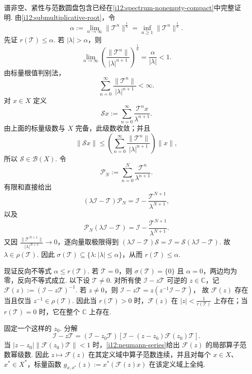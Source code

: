 \begin{FAProof}
谱非空、紧性与范数圆盘包含已经在\autoref{i12:spectrum-nonempty-compact}中完整证明. 由\autoref{i12:submultiplicative-root}，令
\[
\alpha
:=
\lim_{n\to\infty}\|\mathcal T^n\|^{\frac{1}{n}}
=
\inf_{n\geqslant1}\|\mathcal T^n\|^{\frac{1}{n}}.
\]
先证 \(\displaystyle r(\mathcal T)\leqslant\alpha\). 若 \(\displaystyle |\lambda|>\alpha\)，则
\[
\lim_{n\to\infty}
\left(
\frac{\|\mathcal T^n\|}{|\lambda|^{n+1}}
\right)^{\frac{1}{n}}
=
\frac{\alpha}{|\lambda|}
<1.
\]
由标量根值判别法，
\[
\sum_{n=0}^{\infty}
\frac{\|\mathcal T^n\|}{|\lambda|^{n+1}}
<\infty.
\]
对 \(\displaystyle x\in X\) 定义
\[
\mathcal Sx
:=
\sum_{n=0}^{\infty}
\frac{\mathcal T^n x}{\lambda^{n+1}}.
\]
由上面的标量级数与 \(\displaystyle X\) 完备，此级数收敛；并且
\[
\|\mathcal Sx\|
\leqslant
\left(
\sum_{n=0}^{\infty}
\frac{\|\mathcal T^n\|}{|\lambda|^{n+1}}
\right)
\|x\|,
\]
所以 \(\displaystyle \mathcal S\in\mathcal B(X)\). 令
\[
\mathcal P_N
:=
\sum_{n=0}^{N}
\frac{\mathcal T^n}{\lambda^{n+1}}.
\]
有限和直接给出
\[
(\lambda\mathcal I-\mathcal T)\mathcal P_N
=
\mathcal I-\frac{\mathcal T^{N+1}}{\lambda^{N+1}},
\]
以及
\[
\mathcal P_N(\lambda\mathcal I-\mathcal T)
=
\mathcal I-\frac{\mathcal T^{N+1}}{\lambda^{N+1}}.
\]
又因 \(\displaystyle \frac{\|\mathcal T^{N+1}\|}{|\lambda|^{N+1}}\to0\)，逐向量取极限得到
\(\displaystyle (\lambda\mathcal I-\mathcal T)\mathcal S = \mathcal I = \mathcal S(\lambda\mathcal I-\mathcal T)\).
故 \(\displaystyle \lambda\in\rho(\mathcal T)\). 因此 \(\displaystyle \sigma(\mathcal T)\subseteq\{\lambda:|\lambda|\leqslant\alpha\}\)，从而 \(\displaystyle r(\mathcal T)\leqslant\alpha\).

现证反向不等式 \(\displaystyle \alpha\leqslant r(\mathcal T)\). 若 \(\displaystyle \mathcal T=0\)，则 \(\displaystyle \sigma(\mathcal T)=\{0\}\) 且 \(\displaystyle \alpha=0\)，两边均为零，反向不等式成立. 以下设 \(\displaystyle \mathcal T\neq0\). 对所有使 \(\displaystyle \mathcal I-z\mathcal T\) 可逆的 \(\displaystyle z\in\mathbb C\)，记
\(\displaystyle \mathcal F(z) := (\mathcal I-z\mathcal T)^{-1}\).
若 \(\displaystyle z\neq0\)，则
\(\displaystyle \mathcal I-z\mathcal T = z(z^{-1}\mathcal I-\mathcal T)\)，
故 \(\displaystyle \mathcal F(z)\) 存在当且仅当 \(\displaystyle z^{-1}\in\rho(\mathcal T)\). 因此当 \(\displaystyle r(\mathcal T)>0\) 时，\(\displaystyle \mathcal F(z)\) 在 \(\displaystyle |z|<\frac{1}{r(\mathcal T)}\) 上存在；当 \(\displaystyle r(\mathcal T)=0\) 时，它在整个 \(\displaystyle \mathbb C\) 上存在.

固定一个这样的 \(\displaystyle z_0\). 分解
\[
\mathcal I-z\mathcal T
=
(\mathcal I-z_0\mathcal T)
\left[
\mathcal I-(z-z_0)\mathcal F(z_0)\mathcal T
\right].
\]
当 \(\displaystyle |z-z_0|\|\mathcal F(z_0)\mathcal T\|<1\) 时，\autoref{i12:neumann-series}给出 \(\displaystyle \mathcal F(z)\) 的局部算子范数幂级数. 因此 \(\displaystyle z\mapsto\mathcal F(z)\) 在其定义域中算子范数连续，并且对每个 \(\displaystyle x\in X\)、\(\displaystyle x^*\in X^*\)，标量函数
\(\displaystyle g_{x,x^*}(z) := x^*(\mathcal F(z)x)\)
在该定义域上全纯.


\end{FAProof}
